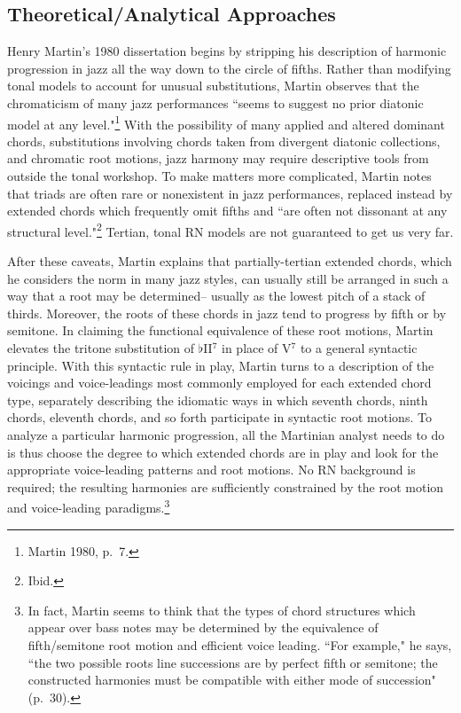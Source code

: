 \subsection{Theoretical/Analytical Approaches}
Henry Martin's 1980 dissertation begins by stripping his description of harmonic progression in jazz all the way down to the circle of fifths.  Rather than modifying tonal models to account for unusual substitutions, Martin observes that the chromaticism of many jazz performances ``seems to suggest no prior diatonic model at any level."\footnote{Martin 1980, p.\ 7.}  With the possibility of many applied and altered dominant chords, substitutions involving chords taken from divergent diatonic collections, and chromatic root motions, jazz harmony may require descriptive tools from outside the tonal workshop.  To make matters more complicated, Martin notes that triads are often rare or nonexistent in jazz performances, replaced instead by extended chords which frequently omit fifths and ``are often not dissonant at any structural level."\footnote{Ibid.}  Tertian, tonal RN models are not guaranteed to get us very far.

After these caveats, Martin explains that partially-tertian extended chords, which he considers the norm in many jazz styles, can usually still be arranged in such a way that a root may be determined-- usually as the lowest pitch of a stack of thirds.  Moreover, the roots of these chords in jazz tend to progress by fifth or by semitone.  In claiming the functional equivalence of these root motions, Martin elevates the tritone substitution of $\flat$II$^7$ in place of V$^7$ to a general syntactic principle.  With this syntactic rule in play, Martin turns to a description of the voicings and voice-leadings most commonly employed for each extended chord type, separately describing the idiomatic ways in which seventh chords, ninth chords, eleventh chords, and so forth participate in syntactic root motions.  To analyze a particular harmonic progression, all the Martinian analyst needs to do is thus choose the degree to which extended chords are in play and look for the appropriate voice-leading patterns and root motions.  No RN background is required; the resulting harmonies are sufficiently constrained by the root motion and voice-leading paradigms.\footnote{In fact, Martin seems to think that the types of chord structures which appear over bass notes may be determined by the equivalence of fifth/semitone root motion and efficient voice leading.  ``For example," he says, ``the two possible roots line successions are by perfect fifth or semitone; the constructed harmonies must be compatible with either mode of succession" (p.\ 30).}

